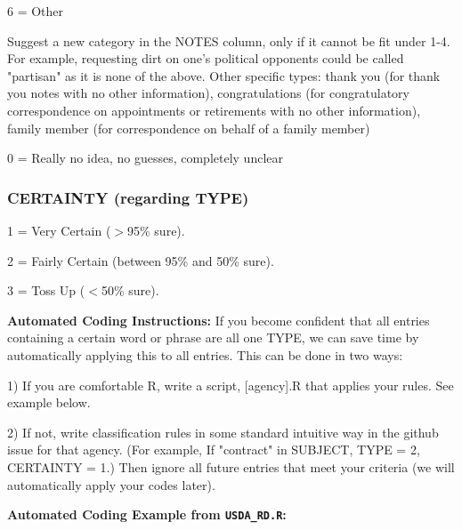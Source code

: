 \documentclass[12pt]{article}
\newenvironment{tight_itemize}{
\begin{itemize}
  \setlength{\itemsep}{0pt}
  \setlength{\parskip}{0pt}
 }{\end{itemize}}
\begin{document}
6 = Other \\

\hfill\begin{minipage}{\dimexpr\textwidth-2cm}
	Suggest a new category in the NOTES column, only if it cannot be fit under 1-4. For example, requesting dirt on one's political opponents could be called "partisan" as it is none of the above. Other specific types: thank you (for thank you notes with no other information), congratulations (for congratulatory correspondence on appointments or retirements with no other information), family member (for correspondence on behalf of a family member) \\
\end{minipage}

0  = Really no idea, no guesses, completely unclear \\
 

\subsubsection{CERTAINTY (regarding TYPE)} 
\begin{tight_itemize}
 \item[] 1 = Very Certain ($>$95\% sure).
\item[] 2 = Fairly Certain (between 95\% and 50\% sure).
\item[] 3 = Toss Up ($<$50\% sure).
\end{tight_itemize}

 
\bigskip
\textbf{Automated Coding Instructions:}
If you become confident that all entries containing a certain word or phrase are all one TYPE, we can save time by automatically applying this to all entries. This can be done in two ways:
\begin{tight_itemize}
\item[1)] If you are comfortable R, write a script, [agency].R that applies your rules. See example below.
\item[2)] If not, write classification rules in some standard intuitive way in the github issue for that agency. (For example, If "contract" in SUBJECT, TYPE = 2, CERTAINTY = 1.) Then ignore all future entries that meet your criteria (we will automatically apply your codes later).
\end{tight_itemize}

\newpage
\textbf{Automated Coding Example from {\tt USDA\_RD.R}:}
\end{document}
